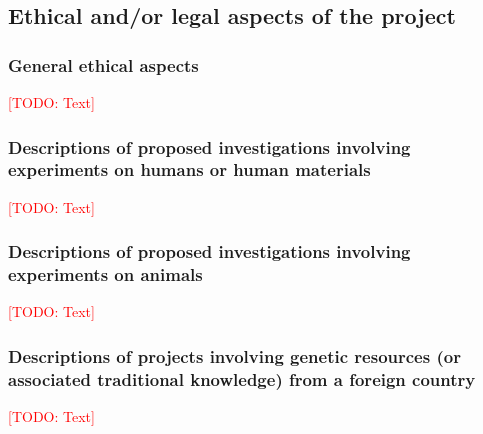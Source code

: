 \documentclass[american,firsttime]{dfgproposal}
\newcommand{\todo}[1]{\xspace{\textcolor{red}{[TODO: #1]}}\xspace}
\begin{document}
	\subsection{Ethical and/or legal aspects of the project}
	
	\subsubsection{General ethical aspects}
	\todo{Text}
	
	\subsubsection{Descriptions of proposed investigations involving experiments on humans or human materials}
	\todo{Text}
	
	\subsubsection{Descriptions of proposed investigations involving experiments on animals}
	\todo{Text}
	
	\subsubsection{Descriptions of projects involving genetic resources (or associated traditional knowledge) from a foreign country}
	\todo{Text}
	
\end{document}
